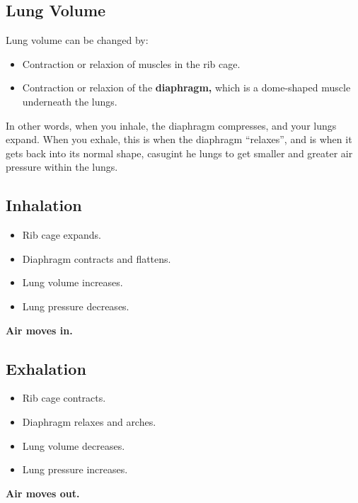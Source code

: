 \documentclass[12pt]{report}
\begin{document}
\subsection{Lung Volume}
\begin{definition}
    Lung volume can be changed by: 
    \begin{itemize}
        \item{Contraction or relaxion of muscles in the rib cage.}
        \item{Contraction or relaxion of the \textbf{diaphragm,} which is a dome-shaped muscle underneath the lungs.}
    \end{itemize}
    In other words, when you inhale, the diaphragm compresses, and your lungs expand. When you exhale, this is when the diaphragm ``relaxes'', and is when it gets back into its normal shape, casugint he lungs to get smaller and greater air pressure within the lungs.
\end{definition}


\subsection{Inhalation}
\begin{definition}[Inhalation]
    \invis
    \begin{itemize}
        \item{Rib cage expands.}
        \item{Diaphragm contracts and flattens.}
        \item{Lung volume increases.}
        \item{Lung pressure decreases.}
    \end{itemize}
    \textbf{Air moves in.}
\end{definition}

\subsection{Exhalation}
\begin{definition}[Exhalation]
    \invis
    \begin{itemize}
        \item{Rib cage contracts.}
        \item{Diaphragm relaxes and arches.}
        \item{Lung volume decreases.}
        \item{Lung pressure increases.}
    \end{itemize}
    \textbf{Air moves out.}
\end{definition}
\end{document}
